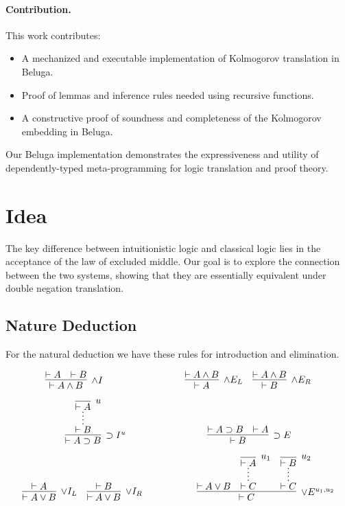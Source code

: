 \documentclass{article}
\begin{document}
\paragraph{Contribution.} This work contributes:
\begin{itemize}
    \item A mechanized and executable implementation of Kolmogorov translation in Beluga.
    \item Proof of lemmas and inference rules needed using recursive functions.
    \item A constructive proof of soundness and completeness of the Kolmogorov embedding in Beluga.
\end{itemize}
Our Beluga implementation demonstrates the expressiveness and utility of dependently-typed meta-programming for logic translation and proof theory.

\section{Idea}

The key difference between intuitionistic logic and classical logic lies in the acceptance of the law of excluded middle. Our goal is to explore the connection between the two systems, showing that they are essentially equivalent under double negation translation.


\subsection{Nature Deduction}
For the natural deduction we have these rules for
 introduction and elimination.

\[
\infer[\land I]{\vdash A \land B}{\vdash A & \vdash B}
\hspace{3cm}
\infer[\land E_L]{\vdash A}{\vdash A \land B}
\quad
\infer[\land E_R]{\vdash B}{\vdash A \land B}
\]


\[
\infer[\supset I^u]{\vdash A \supset B}{
  \infer*{\vdash B}{\infer [u]{\vdash A}{}}
}
\hspace{3cm}
\infer[\supset E]{\vdash B}{\vdash A \supset B & \vdash A}
\]



\[
\infer[\lor I_L]{\vdash A \lor B}{\vdash A}
\quad
\infer[\lor I_R]{\vdash A \lor B}{\vdash B}
\hspace{2cm}
\infer[\lor E^{u_1, u_2}]{\vdash C}{
  \vdash A \lor B
  \quad
  \infer*{\vdash C}{\infer[u_1]{\vdash A}{}}
  \quad
  \infer*{\vdash C}{\infer[u_2]{\vdash B}{}}
}
\]
\end{document}
